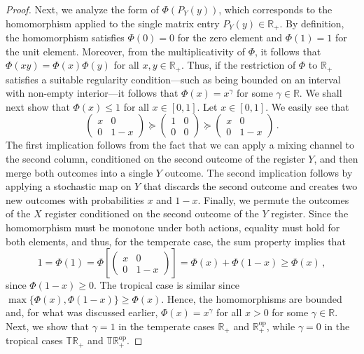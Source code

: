 \documentclass[aps,pra,11pt,onecolumn,nofootinbib,tightenlines]{revtex4-2}
\theoremstyle{definition}
\newcommand{\mb}[1]{\mathbb{#1}}
\begin{document}
\begin{proof}
Next, we analyze the form of $\Phi(P_Y(y))$, which corresponds to the homomorphism applied to the single matrix entry $P_Y(y) \in \mb R_+$. 
By definition, the homomorphism satisfies $\Phi(0) = 0$ for the zero element and $\Phi(1) = 1$ for the unit element.
Moreover, from the multiplicativity of $\Phi$, it follows that $\Phi(xy)=\Phi(x)\Phi(y)$ for all $x,y\in\mb R_+$. Thus, if the restriction of $\Phi$ to $\mathbb{R}_+$ satisfies a suitable regularity condition—such as being bounded on an interval with non-empty interior—it follows that $\Phi(x) = x^\gamma$ for some $\gamma \in \mathbb{R}$.
 We shall next show that $\Phi(x)\leq 1$ for all $x\in[0,1]$. Let $x\in[0,1]$. We easily see that
\begin{equation}\label{eq:x1}
\left(\begin{array}{cc}
x&0\\
0&1-x
\end{array}\right)\succeq\left(\begin{array}{cc}
1&0\\
0&0
\end{array}\right)\succeq\left(\begin{array}{cc}
x&0\\
0&1-x
\end{array}\right) \,.
\end{equation}
The first implication follows from the fact that we can apply a mixing channel to the second column, conditioned on the second outcome of the register $Y$, and then merge both outcomes into a single $Y$ outcome. The second implication follows by applying a stochastic map on $Y$ that discards the second outcome and creates two new outcomes with probabilities $x$ and $1-x$. Finally, we permute the outcomes of the $X$ register conditioned on the second outcome of the $Y$ register. Since the homomorphism must be monotone under both actions, equality must hold for both elements, and thus, for the temperate case, the sum property implies that
\begin{equation}
1=\Phi(1)=\Phi\left[\left(\begin{array}{cc}
x&0\\
0&1-x
\end{array}\right)\right]=\Phi(x)+\Phi(1-x)\geq\Phi(x) \,,
\end{equation}
since $\Phi(1-x)\geq 0$. The tropical case is similar since $\max\{\Phi(x),\Phi(1-x)\} \geq \Phi(x)$. Hence, the homomorphisms are bounded and, for what was discussed earlier, $\Phi(x)=x^\gamma$ for all $x>0$ for some $\gamma\in\mb R$. Next, we show that $\gamma = 1$ in the temperate cases $\mathbb{R}_+$ and $\mathbb{R}^{\mathrm{op}}_+$, while $\gamma = 0$ in the tropical cases $\mathbb{TR}_+$ and $\mathbb{TR}^{\mathrm{op}}_+$.

\end{proof}
\end{document}
